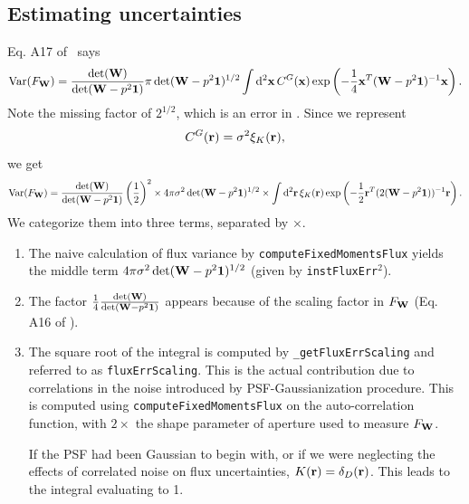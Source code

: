 \documentclass[DM,lsstdraft, authoryear,toc]{lsstdoc}
\newcommand{\rmd}{\mathrm{d}^2}
\begin{document}
\subsection{Estimating uncertainties}
Eq. A17 of~\cite{Kuijken2015} says
\begin{equation}
    \text{Var}(F_{\bf W}) = \frac{\det({\bf W})}{\det({\bf W}-p^2\bf{1})} \pi \det({\bf W}-p^2{\bf 1})^{1/2} \int\rmd {\bf x}\, C^G({\bf x}) \exp\left(-\frac{1}{4}{\bf x}^T({\bf W}-p^2{\bf 1})^{-1}{\bf x}\right).
    \label{eq:A17}
\end{equation}
Note the missing factor of $2^{1/2}$, which is an error in \cite{Kuijken2015}.
Since we represent
\begin{equation}
    C^G({\bf r}) = \sigma^2 \xi_{K}({\bf r}),
\end{equation}
we get
\begin{equation}
  \text{Var}(F_{\bf W}) = \frac{\det({\bf W})}{\det({\bf W}-p^2\bf{1})}\left(\frac{1}{2}\right)^2 \times 4\pi \sigma^2 \det({\bf W}-p^2{\bf 1})^{1/2} \times \int\rmd {\bf r}\, \xi_{K}({\bf r}) \exp\left(-\frac{1}{2}{\bf r}^T(2({\bf W}-p^2{\bf 1}))^{-1}{\bf r}\right).
\end{equation}
We categorize them into three terms, separated by $\times$.
\begin{enumerate}
  \item The naive calculation of flux variance by \texttt{computeFixedMomentsFlux} yields the middle term $4\pi \sigma^2 \det({\bf W}-p^2{\bf 1})^{1/2}$ (given by \texttt{instFluxErr}$^2$).
  \item The factor $\frac{1}{4}\frac{\det({\bf W})}{\det({\bf W}-p^2\bf{1})}$ appears because of the scaling factor in $F_{\bf W}$ (Eq. A16 of \cite{Kuijken2015}).
  \item The square root of the integral is computed by \texttt{\_getFluxErrScaling} and referred to as \texttt{fluxErrScaling}. This is the actual contribution due to correlations in the noise introduced by PSF-Gaussianization procedure. This is computed using \texttt{computeFixedMomentsFlux} on the auto-correlation function, with $2 \times$ the shape parameter of aperture used to measure $F_{\bf W}$.

  If the PSF had been Gaussian to begin with, or if we were neglecting the effects of correlated noise on flux uncertainties, $K({\bf r}) = \delta_D({\bf r})$. This leads to the integral evaluating to 1.
\end{enumerate}
\end{document}
